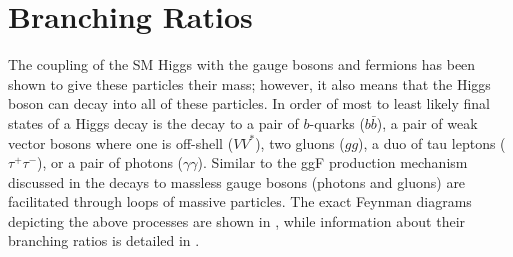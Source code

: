 \section{Branching Ratios} \label{sec:higgs:branching}

The coupling of the SM Higgs with the gauge bosons and fermions has been shown
to give these particles their mass; however, it also means that the Higgs boson can
decay into all of these particles.  In order of most to least likely final
states of a Higgs decay is the decay to a pair of $b$-quarks ($b\bar{b}$),
a pair of weak vector bosons where one is off-shell ($VV^{*}$), two gluons
($gg$), a duo of tau leptons ($\tau^{+}\tau^{-}$), or a pair of photons
($\gamma\gamma$).  Similar to the ggF production mechanism discussed in
 the decays to massless gauge bosons (photons and
gluons) are facilitated through loops of massive particles. The exact Feynman
diagrams depicting the above processes are shown in , while
information about their branching ratios is detailed in
.


